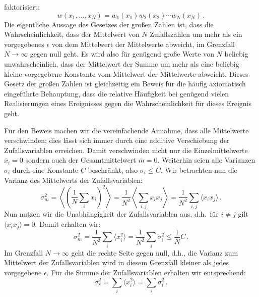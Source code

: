faktorisiert:
\begin{equation}
   w(x_1,...,x_N) = w_1(x_1) w_2(x_2) \cdots w_N(x_N) \, .
\end{equation}
Die eigentliche Aussage des Gesetzes der
gro\ss en Zahlen ist, dass die Wahrscheinlichkeit,
dass der Mittelwert von $N$ Zufallszahlen um
mehr als ein vorgegebenes $\epsilon$ von dem
Mittelwert der Mittelwerte abweicht, im Grenzfall
$N\rightarrow \infty$ gegen null geht. Es wird also
f\"ur gen\"ugend gro\ss e Werte von $N$ beliebig
unwahrscheinlich, dass der Mittelwert der Summe 
um mehr als eine beliebig kleine vorgegebene 
Konstante vom Mittelwert der Mittelwerte abweicht.
Dieses Gesetz der gro\ss en Zahlen ist
gleichzeitig ein Beweis f\"ur die h\"aufig
axiomatisch eingef\"uhrte Behauptung, dass die
relative H\"aufigkeit bei gen\"ugend vielen
Realisierungen eines Ereignisses gegen die
Wahrscheinlichkeit f\"ur dieses Ereignis geht.

F\"ur den Beweis machen wir die vereinfachende
Annahme, dass alle Mittelwerte verschwinden; dies 
l\"asst sich immer durch eine additive Verschiebung der
Zufallsvariablen erreichen. Damit verschwinden
nicht nur die Einzelmittelwerte $\bar{x}_i=0$
sondern auch der Gesamtmittelwert $\bar{m}=0$.
Weiterhin seien alle Varianzen 
$\sigma_i$ durch eine Konstante $C$
beschr\"ankt, also $\sigma_i \leq C$.
Wir betrachten nun die Varianz des Mittelwerts
der Zufallsvariablen:
\begin{equation}
  \sigma_m^2 = \left\langle \left( \frac{1}{N} \sum_i x_i
  \right)^2 \right\rangle = \frac{1}{N^2} 
  \left\langle \sum_{i,j} x_i x_j \right\rangle 
  = \frac{1}{N^2} \sum_{i,j} \langle x_i x_j \rangle \, .
\end{equation}
Nun nutzen wir die Unabh\"angigkeit der
Zufallsvariablen aus, d.h.\ f\"ur $i \neq j$ gilt
$\langle x_i x_j\rangle =0$. Damit erhalten wir:
\begin{equation}
  \sigma_m^2 = \frac{1}{N^2} \sum_i
  \langle  x_i^2 \rangle
   = \frac{1}{N^2} \sum_i \sigma_i^2 \leq  \frac{1}{N} C  \, .
\end{equation}
Im Grenzfall $N\rightarrow \infty$ geht die rechte
Seite gegen null, d.h., die Varianz zum Mittelwert
der Zufallsvariablen wird in diesem Grenzfall
kleiner als jedes vorgegebene $\epsilon$. 
F\"ur die Summe der Zufallsvariablen erhalten
wir entsprechend:
\begin{equation}
  \sigma_s^2 = \sum_i 
 \langle  x_i^2  \rangle
   =\sum_i  \sigma_i^2 \, .
\end{equation}

